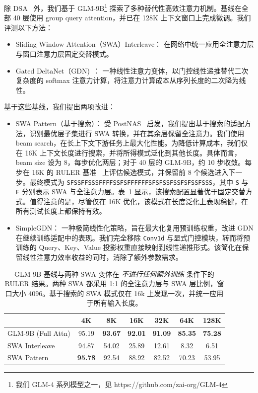 除 DSA~\cite{liu2025deepseek} 外，我们基于 GLM-9B\footnote{我们 GLM-4 系列模型之一，见 https://github.com/zai-org/GLM-4} 探索了多种替代性高效注意力机制。基线在全部 40 层使用 group query attention，并已在 128K 上下文窗口上完成微调。我们评测以下方法：

\begin{itemize}[leftmargin=1.5em,itemsep=2pt]
    \item {{Sliding Window Attention（SWA）Interleave：}} 在网络中统一应用全注意力层与窗口注意力层固定交替模式。
    \item {{Gated DeltaNet（GDN)}~\cite{yanggated}：} 一种线性注意力变体，以门控线性递推替代二次复杂度的 softmax 注意力计算，将注意力计算成本从序列长度的二次降为线性。
\end{itemize}

\noindent 基于这些基线，我们提出两项改进：

\begin{itemize}[leftmargin=1.5em,itemsep=2pt]
    \item {SWA Pattern（基于搜索）：} 受 PostNAS~\cite{gu2025jet} 启发，我们提出基于搜索的适配方法，识别最优层子集进行 SWA 转换，并在其余层保留全注意力。我们使用 beam search，在长上下文下游任务上最大化性能。为降低计算成本，我们仅在 16K 上下文长度进行搜索，并将所得模式泛化到其他长度。具体而言，beam size 设为 8，每步优化两层；对于 40 层的 GLM-9B，约 10 步收敛。每步在 16K 的 RULER 基准~\cite{hsiehruler} 上评估候选模式，并保留前 8 个候选进入下一步。最终模式为 \texttt{SFSSFFSSSFFFFSSFSFFFFFFSFSFSSFSSFSFSSFSSS}，其中 \texttt{S} 与 \texttt{F} 分别表示 SWA 与全注意力层。表~\ref{tab:ruler_results} 显示，该搜索配置显著优于固定交替方式。值得注意的是，尽管仅在 16K 优化，该模式在长度泛化上表现稳健，在所有测试长度上都保持有效。

    \item {SimpleGDN：} 一种极简线性化策略，旨在最大化复用预训练权重，改进 GDN 在继续训练适配中的表现。我们完全移除 \texttt{Conv1d} 与显式门控模块，转而将预训练的 Query、Key、Value 投影权重直接映射到线性递推形式。该简化在保留线性注意力效率收益的同时，消除了额外参数需求。
\end{itemize}

\begin{table}[h]
    \small
    \centering
    \caption{GLM-9B 基线与两种 SWA 变体在 \emph{不进行任何额外训练} 条件下的 RULER 结果。两种 SWA 都采用 1:1 的全注意力层与 SWA 层比例，窗口大小 4096。基于搜索的 SWA 模式仅在 16k 上发现一次，并统一应用于所有输入长度。}
    \label{tab:ruler_results}
    \begin{tabular}{lcccccc}
        \toprule
         & {4K} & {8K} & {16K} & {32K} & {64K} & {128K} \\
        \midrule
        GLM-9B (Full Attn)  & 95.19 & \textbf{93.67} & \textbf{92.01} & \textbf{91.09} & \textbf{85.35} & \textbf{75.28} \\
        SWA Interleave      & 94.87 & 54.02 & 25.89 & 12.61 &  8.32 &  6.51 \\
        SWA Pattern & \textbf{95.78} & 92.54 & 88.92 & 82.52 & 70.23 & 53.95 \\
        \bottomrule
    \end{tabular}
\end{table}


